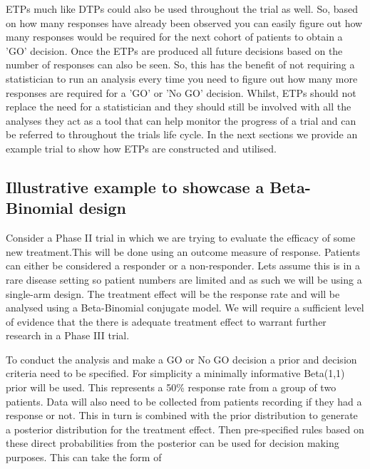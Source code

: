 ETPs much like DTPs could also be used throughout the trial as well. So, based on how many responses have already been observed you can easily figure out how many responses would be required for the next cohort of patients to obtain a 'GO' decision. Once the ETPs are produced all future decisions based on the number of responses can also be seen. So, this has the benefit of not requiring a statistician to run an analysis every time you need to figure out how many more responses are required for a 'GO' or 'No GO' decision. Whilst, ETPs should not replace the need for a statistician and they should still be involved with all the analyses they act as a tool that can help monitor the progress of a trial and can be referred to throughout the trials life cycle. In the next sections we provide an example trial to show how ETPs are constructed and utilised. 


\subsection{Illustrative example to showcase a Beta-Binomial design} 
\label{etp:BBIllEx}

Consider a Phase \RN{2} trial in which we are trying to evaluate the efficacy of some new treatment.This will be done using an outcome measure of response. Patients can either be considered a responder or a non-responder. Lets assume this is in a rare disease setting so patient numbers are limited and as such we will be using a single-arm design. The treatment effect will be the response rate and will be analysed using a Beta-Binomial conjugate model. We will require a sufficient level of evidence that the there is adequate treatment effect to warrant further research in a Phase \RN{3} trial.

To conduct the analysis and make a GO or No GO decision a prior and decision criteria need to be specified. For simplicity a minimally informative Beta(1,1) prior will be used. This represents a 50\% response rate from a group of two patients. Data will also need to be collected from patients recording if they had a response or not. This in turn is combined with the prior distribution to generate a posterior distribution for the treatment effect. Then pre-specified rules based on these direct probabilities from the posterior can be used for decision making purposes. This can take the form of

